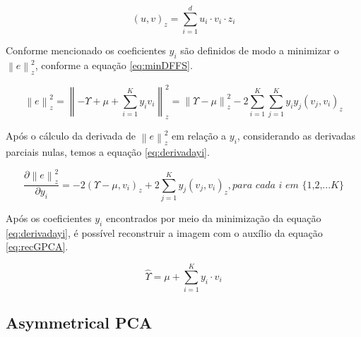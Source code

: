 \begin{equation}
(u,v)_z = \sum_{i=1}^{d}u_i \cdot v_i \cdot z_i
\label{eq:produtogappy}
\end{equation}

Conforme mencionado os coeficientes $y_i$ são definidos de modo a minimizar o $\left \| e \right \|^2_z$, conforme a equação \ref{eq:minDFFS}.

\begin{equation}
\left \| e \right \|^2_z = \left \| - \Upsilon + \mu + \sum_{i=1}^{K}y_iv_i \right \|^2_z = \left \|    \Upsilon - \mu \right \|^2_z - 2\sum_{i=1}^{K}\sum_{j=1}^{K}y_iy_j(v_j,v_i)_z
\label{eq:minDFFS}
\end{equation}

Após o cálculo da derivada de $\left \| e \right \|^2_z$ em relação a $y_i$, considerando as derivadas parciais nulas, temos a equação \ref{eq:derivadayi}.

\begin{equation}
 \frac{\partial \left \| e \right \|^2_z}{\partial y_i} = -2(\Upsilon- \mu,v_i)_z + 2 \sum_{j=1}^{K}y_j(v_j,v_i)_z, \textit{para cada i em \{1,2,...K\}}
 \label{eq:derivadayi}
\end{equation}

Após os coeficientes $y_i$ encontrados por meio da minimização da equação \ref{eq:derivadayi}, é possível reconstruir a imagem com o auxílio da equação \ref{eq:recGPCA}.

\begin{equation}
\hat{\Upsilon} =  \mu + \sum_{i=1}^{K}y_i \cdot v_i
\label{eq:recGPCA}
\end{equation}




\subsection{Asymmetrical PCA}
\label{sub:apca}



